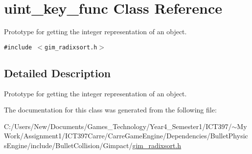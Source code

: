 \hypertarget{classuint__key__func}{
\section{uint\_\-key\_\-func Class Reference}
\label{classuint__key__func}
}
Prototype for getting the integer representation of an object.  


{\tt \#include $<$gim\_\-radixsort.h$>$}



\subsection{Detailed Description}
Prototype for getting the integer representation of an object. 

The documentation for this class was generated from the following file:\begin{CompactItemize}
\item 
C:/Users/New/Documents/Games\_\-Technology/Year4\_\-Semester1/ICT397/$\sim$My Work/Assignment1/ICT397Carre/CarreGameEngine/Dependencies/BulletPhysicsEngine/include/BulletCollision/Gimpact/\hyperlink{gim__radixsort_8h}{gim\_\-radixsort.h}\end{CompactItemize}
